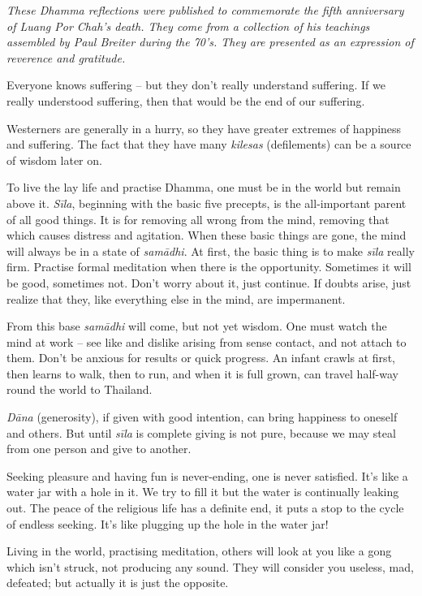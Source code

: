 
\emph{These Dhamma reflections were published to commemorate the fifth
anniversary of Luang Por Chah's death. They come from a collection of
his teachings assembled by Paul Breiter during the
70's. They are presented as an expression of reverence and
gratitude.}

Everyone knows suffering -- but they don't really understand suffering.
If we really understood suffering, then that would be the end of our
suffering.

Westerners are generally in a hurry, so they have greater extremes of
happiness and suffering. The fact that they have many \emph{kilesas}
 (defilements) can be a source of wisdom later on.

To live the lay life and practise Dhamma, one must be in the world but
remain above it. \emph{Sīla}, beginning with the basic five precepts, is
the all-important parent of all good things. It is for removing all
wrong from the mind, removing that which causes distress and agitation. 
When these basic things are gone, the mind will always be in a state of
\emph{samādhi}. At first, the basic thing is to make \emph{sīla} really
firm. Practise formal meditation when there is the opportunity. 
Sometimes it will be good, sometimes not. Don't worry about it, just
continue. If doubts arise, just realize that they, like everything else
in the mind, are impermanent.

From this base \emph{samādhi} will come, but not yet wisdom. One must watch
the mind at work -- see like and dislike arising from sense contact, and
not attach to them. Don't be anxious for results or quick progress. An
infant crawls at first, then learns to walk, then to run, and when it is
full grown, can travel half-way round the world to Thailand. 

\emph{Dāna} (generosity), if given with good intention, can bring
happiness to oneself and others. But until \emph{sīla} is complete
giving is not pure, because we may steal from one person and give to
another. 

Seeking pleasure and having fun is never-ending, one is never satisfied. 
It's like a water jar with a hole in it. We try to fill it but the water
is continually leaking out. The peace of the religious life has a
definite end, it puts a stop to the cycle of endless seeking. It's like
plugging up the hole in the water jar! 

Living in the world, practising meditation, others will look at you like
a gong which isn't struck, not producing any sound. They will consider
you useless, mad, defeated; but actually it is just the opposite. 

